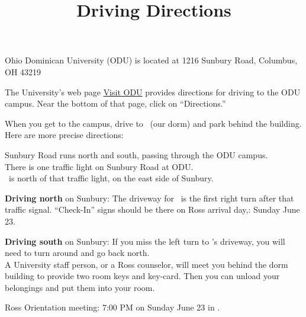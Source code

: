 \documentclass{ross}
\title{Driving Directions}
\newcommand{\spa}{\hspace*{1cm}}
\begin{document}
\maketitle

Ohio Dominican University (ODU) is located at 1216 Sunbury Road, Columbus, OH 43219

The University's web page 
\href{https://www.ohiodominican.edu/future-students/admissions-aid/visit-odu/locations}{Visit ODU}  provides directions for driving to the ODU campus.  Near the bottom of that page, click on ``Directions.''   

When you get to the campus, drive to \dormname\ (our dorm) and park behind the building.  \\
Here are more precise directions:

\spa Sunbury Road runs north and south, passing through the ODU campus.\\
\spa There is one traffic light on Sunbury Road at ODU. \\
\spa \dormname\ is north of that traffic light, on the east side of Sunbury.
 
 {\bf Driving north} on Sunbury: The driveway for  \dormname\ is the first right turn after that traffic signal.  ``Check-In'' signs should be there on Ross arrival day,: Sunday June 23.

 {\bf Driving south} on Sunbury: If you miss the left turn to \dormname's driveway,  you will need to turn around and go back north.\\


A University staff person, or a Ross counselor, will meet you behind the dorm building to provide two room keys and key-card.  Then you can unload your belongings and put them into your room. 

Ross Orientation meeting:  7:00 PM on Sunday June 23 in \orientationlocation.
\end{document}
